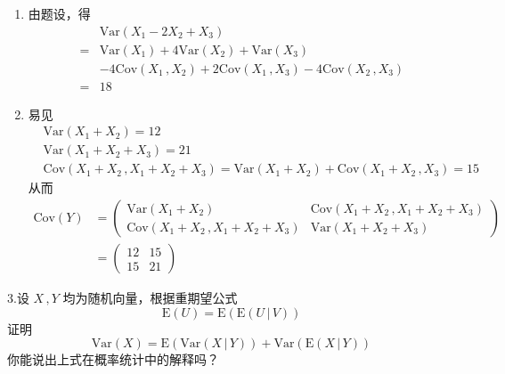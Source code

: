 \documentclass[12pt,hyperref,]{ctexart}
\begin{document}
\begin{enumerate}
\def\labelenumi{(\alph{enumi})}
\item
  由题设，得 \begin{equation*}
  \begin{aligned}
  &\mathrm{Var}(X_1-2X_2+X_3) \\
  =&\mathrm{Var}(X_1)+4\mathrm{Var}(X_2)+\mathrm{Var}(X_3) \\
  &-4\mathrm{Cov}(X_1\, ,X_2)+2\mathrm{Cov}(X_1\, ,X_3)-4\mathrm{Cov}(X_2\, ,X_3) \\
  =&18
  \end{aligned}
  \end{equation*}
\item
  易见 \begin{equation*}
  \begin{aligned}
  & \mathrm{Var}(X_1+X_2)=12 \\
  & \mathrm{Var}(X_1+X_2+X_3)=21 \\
  & \mathrm{Cov}(X_1+X_2\, ,X_1+X_2+X_3)=\mathrm{Var}(X_1+X_2)+\mathrm{Cov}(X_1+X_2\, ,X_3)=15
  \end{aligned}
  \end{equation*}从而 \begin{equation*}
  \begin{aligned}
  \mathrm{Cov}(Y) &= 
  \begin{pmatrix}
  \mathrm{Var}(X_1+X_2) & \mathrm{Cov}(X_1+X_2\, ,X_1+X_2+X_3) \\
  \mathrm{Cov}(X_1+X_2\, ,X_1+X_2+X_3) & \mathrm{Var}(X_1+X_2+X_3)
  \end{pmatrix} \\
  &= 
  \begin{pmatrix}
  12 & 15 \\
  15 & 21
  \end{pmatrix}
  \end{aligned}
  \end{equation*}
\end{enumerate}

\vspace{3em}

\kaishu

3.设 \(X\, ,Y\) 均为随机向量，根据重期望公式 \begin{equation*}
\mathrm{E}(U)=\mathrm{E}(\mathrm{E}(U\,|\,V))
\end{equation*}证明 \begin{equation*}
\mathrm{Var}(X)=\mathrm{E}(\mathrm{Var}(X\,|\,Y))+\mathrm{Var}(\mathrm{E}(X\,|\,Y))
\end{equation*}你能说出上式在概率统计中的解释吗？
\end{document}
